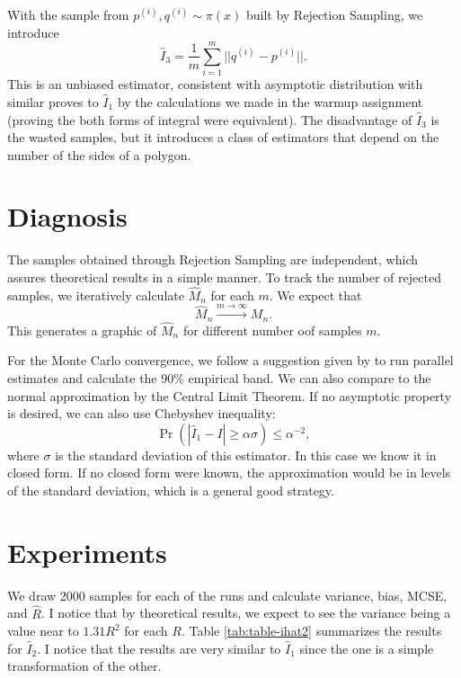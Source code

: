 \documentclass[a4paper,10pt, notitlepage]{report}
\begin{document}
With the sample from $p^{(i)}, q^{(i)} \sim \pi(x)$ built by Rejection Sampling, we
introduce 
$$
\hat{I}_3 = \frac{1}{m} \sum_{i=1}^m ||q^{(i)} - p^{(i)}||. 
$$
This is an unbiased estimator, consistent with asymptotic distribution 
with similar proves to $\hat{I}_1$ by the calculations we made in the warmup
assignment (proving the both forms of integral were equivalent). The disadvantage of $\hat{I}_3$ is the wasted samples,
but it introduces a class of estimators that depend on the number of the sides
of a polygon. 

\section*{Diagnosis}

The samples obtained through Rejection Sampling are independent, which assures
theoretical results in a simple manner. 
To track the number of rejected samples, we iteratively
calculate $\widehat{M}_n$ for each $m$. We expect that 
$$\widehat{M}_n \overset{m \to \infty}{\to} M_n.$$
This generates a graphic of $\widehat{M}_n$ for different number oof samples
$m$.

For the Monte Carlo convergence, we follow a suggestion given by \cite[p.
124]{robert2004monte} to run parallel estimates and calculate the 90\% empirical
band. We can also compare to the normal approximation  by the Central Limit
Theorem. If no asymptotic property is desired, we can also use Chebyshev
inequality:
$$
\Pr(|\hat{I}_1 - I| \ge \alpha \sigma) \le \alpha^{-2},  
$$
where $\sigma$ is the standard deviation of this estimator. In this case we 
know it in closed form. If no closed form were known, the approximation would
be in levels of the standard deviation, which is a general good strategy.

\section*{Experiments}

We draw 2000 samples for each of the runs and calculate variance, bias, MCSE,
and $\hat{R}$. I notice that by theoretical results, we expect to see the
variance being a value near to $1.31 R^2$ for each $R$. Table
\ref{tab:table-ihat2} summarizes the results for $\hat{I}_2$. I notice that
the results are very similar to $\hat{I}_1$ since the one is a simple
transformation of the other. 
\end{document}
